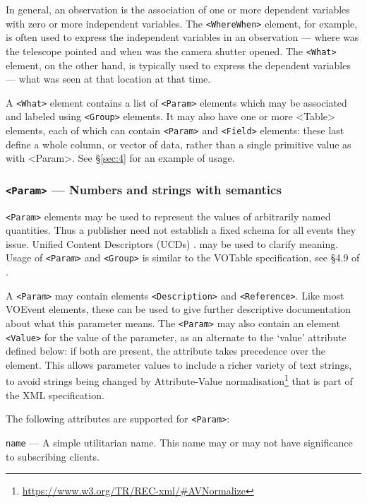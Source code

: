 \documentclass[11pt,a4paper]{ivoa}
\begin{document}
In general, an observation is the association of one or more dependent variables with zero or more independent variables. The {\tt <WhereWhen>} element, for example, is often used to express the independent variables in an observation --- where was the telescope pointed and when was the camera shutter opened. The {\tt <What>} element, on the other hand, is typically used to express the dependent variables --- what was seen at that location at that time. 

A {\tt <What>} element contains a list of {\tt <Param>} elements which may be associated and labeled using {\tt <Group>} elements. It may also have one or more <Table> elements, each of which can contain {\tt <Param>} and {\tt <Field>} elements: these last define a whole column, or vector of data, rather than a single primitive value as with <Param>. See \S\ref{sec:4} for an example of usage. 

\subsubsection{{\tt <Param>} --- Numbers and strings with semantics}
\label{sec:3.3.1}
{\tt <Param>} elements may be used to represent the values of arbitrarily named quantities. Thus a publisher need not establish a fixed schema for all events they issue. Unified Content Descriptors (UCDs) \citep{2018ivoa.spec.0527M}.
may be used to clarify meaning. Usage of {\tt <Param>} and {\tt <Group>} is similar to the VOTable specification, see \S4.9 of \citep{2019ivoa.spec.1021O}. 

A {\tt <Param>} may contain elements {\tt <Description>} and {\tt <Reference>}. Like most VOEvent elements, these can be used to give further descriptive documentation about what this parameter means. The {\tt <Param>} may also contain an element {\tt <Value>} for the value of the parameter, as an alternate to the `value' attribute defined below: if both are present, the attribute takes precedence over the element. This allows parameter values to include a richer variety of text strings, to avoid strings being changed by Attribute-Value normalisation\footnote{\url{https://www.w3.org/TR/REC-xml/\#AVNormalize}} that is part of the XML specification. 

The following attributes are supported for {\tt <Param>}: 

 {\tt name}\label{sec:3.3.1.1} --- A simple utilitarian name. This name may or may not have significance to subscribing clients. 
\end{document}
